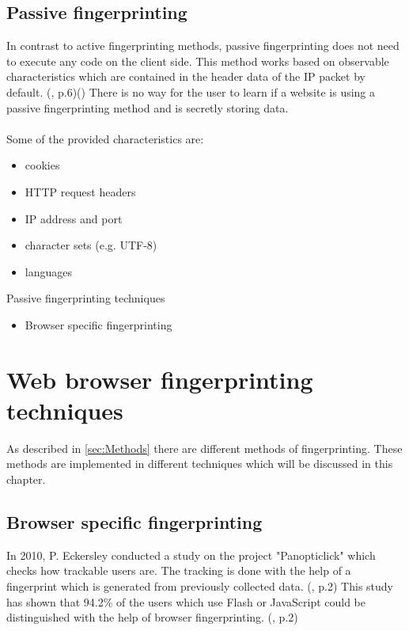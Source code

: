 \subsection{Passive fingerprinting}
In contrast to active fingerprinting methods, passive fingerprinting does not need to execute any code on the client side. This method works based on observable characteristics which are contained in the header data of the IP packet by default. (\textcite{doty18}, p.6)(\textcite{web17}) There is no way for the user to learn if a website is using a passive fingerprinting method and is secretly storing data.\\\\
Some of the provided characteristics are:
\begin{itemize}
	\item cookies
	\item HTTP request headers
	\item IP address and port
	\item character sets (e.g. UTF-8)
	\item languages\\
\end{itemize}
Passive fingerprinting techniques
\begin{itemize}
	\item Browser specific fingerprinting
\end{itemize}

\section{Web browser fingerprinting techniques}
As described in \autoref{sec:Methods} there are different methods of fingerprinting. These methods are implemented in different techniques which will be discussed in this chapter.
\subsection{Browser specific fingerprinting}
In 2010, P. Eckersley conducted a study on the project "Panopticlick" which checks how trackable users are. The tracking is done with the help of a fingerprint which is generated from previously collected data. (\textcite{upi15}, p.2) This study has shown that 94.2\% of the users which use Flash or JavaScript could be distinguished with the help of browser fingerprinting. (\textcite{eckersley10}, p.2)
